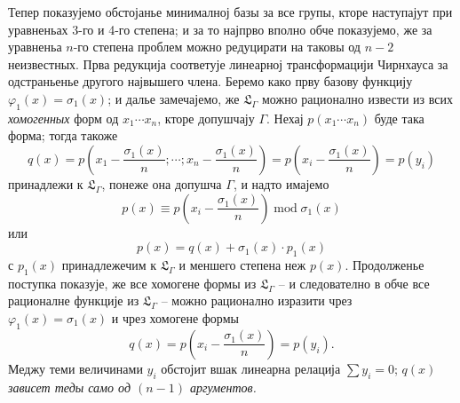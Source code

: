 ﻿\documentclass[11pt]{article}
\begin{document}
Тепер показујемо обстојанье минималној базы за все групы, кторе наступајут при уравненьах 3-го и 4-го степена; и за то најпрво вполно обче показујемо, же за уравненьа $n$-го степена проблем можно редуцирати на таковы од $n-2$ неизвестных. Прва редукција соответује линеарној трансформацији Чирнхауса за одстраньенье другого највышего члена. Беремо како прву базову функцију $\varphi_1(x)=\sigma_1(x)$; и далье замечајемо, же $\mathfrak L_\Gamma$ можно рационално извести из всих {\itshape хомогенных} форм од $x_1\cdots x_n$, кторе допушчају $\Gamma$. Нехај $p(x_1\cdots x_n)$ буде така форма; тогда такоже
\[
q(x)=p\left(x_1-\frac{\sigma_1(x)}{n};\cdots;x_n-\frac{\sigma_1(x)}{n}\right)=p\left(x_i-\frac{\sigma_1(x)}{n}\right)=p(y_i)
\]
принадлежи к $\mathfrak L_\Gamma$, понеже она допушча $\Gamma$, и надто имајемо
\[
p(x)\equiv p\left(x_i-\frac{\sigma_1(x)}{n}\right)\operatorname{mod}\sigma_1(x)
\]
или
\[
p(x)=q(x)+\sigma_1(x)\cdot p_1(x)
\]
с $p_1(x)$ принадлежечим к $\mathfrak L_\Gamma$ и меншего степена неж $p(x)$. Продолженье поступка показује, же все хомогене формы из $\mathfrak L_\Gamma$ -- и следователно в обче все рационалне функције из $\mathfrak L_\Gamma$ -- можно рационално изразити чрез $\varphi_1(x)=\sigma_1(x)$ и чрез хомогене формы
\[
q(x)=p\left(x_i-\frac{\sigma_1(x)}{n}\right)=p(y_i).
\]
Меджу теми величинами $y_i$ обстојит вшак линеарна релација $\sum y_i=0$; $q(x)$ {\itshape зависет теды само од $(n-1)$ аргументов.}
\end{document}
